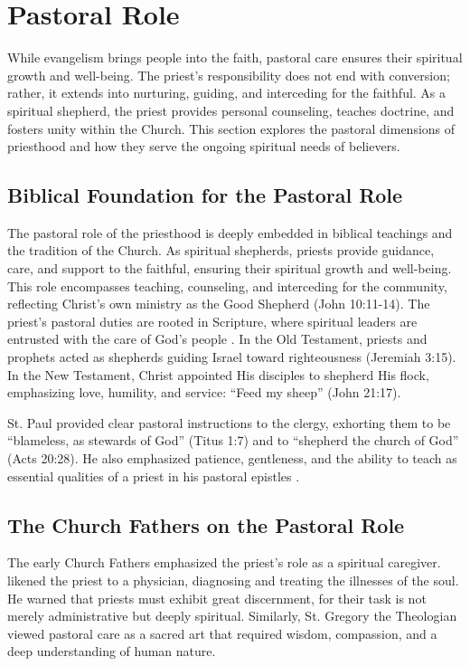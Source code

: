 \documentclass[12pt,doc]{apa7}   	%
\begin{document}
\section{Pastoral Role}\label{pastoral}
While evangelism brings people into the faith, pastoral care ensures their spiritual growth and well-being. The priest’s responsibility does not end with conversion; rather, it extends into nurturing, guiding, and interceding for the faithful. As a spiritual shepherd, the priest provides personal counseling, teaches doctrine, and fosters unity within the Church. This section explores the pastoral dimensions of priesthood and how they serve the ongoing spiritual needs of believers.

\subsection{Biblical Foundation for the Pastoral Role}
The pastoral role of the priesthood is deeply embedded in biblical teachings and the tradition of the Church. As spiritual shepherds, priests provide guidance, care, and support to the faithful, ensuring their spiritual growth and well-being. This role encompasses teaching, counseling, and interceding for the community, reflecting Christ’s own ministry as the Good Shepherd (John 10:11-14).  The priest’s pastoral duties are rooted in Scripture, where spiritual leaders are entrusted with the care of God’s people \citep{complete_work_chrysostom}. In the Old Testament, priests and prophets acted as shepherds guiding Israel toward righteousness (Jeremiah 3:15). In the New Testament, Christ appointed His disciples to shepherd His flock, emphasizing love, humility, and service: ``Feed my sheep'' (John 21:17).

St. Paul provided clear pastoral instructions to the clergy, exhorting them to be ``blameless, as stewards of God'' (Titus 1:7) and to ``shepherd the church of God'' (Acts 20:28). He also emphasized patience, gentleness, and the ability to teach as essential qualities of a priest in his pastoral epistles \citep{hgb-youssef_pastoral_epsitles}.

\subsection{The Church Fathers on the Pastoral Role}

The early Church Fathers emphasized the priest’s role as a spiritual caregiver. \citet{priesthood_chrysostom} likened the priest to a physician, diagnosing and treating the illnesses of the soul. He warned that priests must exhibit great discernment, for their task is not merely administrative but deeply spiritual. Similarly, St. Gregory the Theologian \citep{early_church_akin} viewed pastoral care as a sacred art that required wisdom, compassion, and a deep understanding of human nature.
\end{document}
